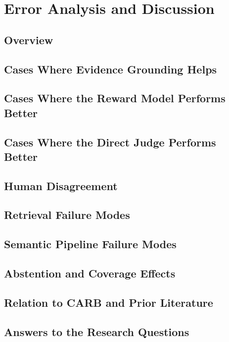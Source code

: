 \chapter{Error Analysis and Discussion}
\label{ch:discussion}
\section{Overview}
\mbox{}\par
\section{Cases Where Evidence Grounding Helps}
\mbox{}\par
\section{Cases Where the Reward Model Performs Better}
\mbox{}\par
\section{Cases Where the Direct Judge Performs Better}
\mbox{}\par
\section{Human Disagreement}
\mbox{}\par
\section{Retrieval Failure Modes}
\mbox{}\par
\section{Semantic Pipeline Failure Modes}
\mbox{}\par
\section{Abstention and Coverage Effects}
\mbox{}\par
\section{Relation to CARB and Prior Literature}
\mbox{}\par
\section{Answers to the Research Questions}
\mbox{}\par
